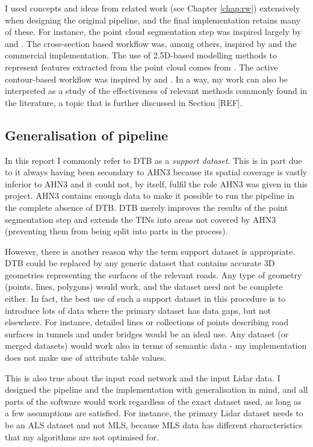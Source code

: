 I used concepts and ideas from related work (see Chapter \ref{chap:rw}) extensively when designing the original pipeline, and the final implementation retains many of these. For instance, the point cloud segmentation step was inspired largely by \cite{oudeElberink_vosselman_2009} and \cite{boyko_funkhauser_2011}. The cross-section based workflow was, among others, inspired by \cite{yang_etal_2013} and the commercial implementation. The use of 2.5D-based modelling methods to represent features extracted from the point cloud comes from \cite{oudeElberink_vosselman_2006}. The active contour-based workflow was inspired by \cite{boyko_funkhauser_2011} and \cite{gopfert_etal_2011}. In a way, my work can also be interpreted as a study of the effectiveness of relevant methods commonly found in the literature, a topic that is further discussed in Section [REF].

\subsection{Generalisation of pipeline}
\label{sub:m_generalisation}

In this report I commonly refer to DTB as a \textit{support dataset}. This is in part due to it always having been secondary to AHN3 because its spatial coverage is vastly inferior to AHN3 and it could not, by itself, fulfil the role AHN3 was given in this project. AHN3 contains enough data to make it possible to run the pipeline in the complete absence of DTB. DTB merely improves the results of the point segmentation step and extends the TINs into areas not covered by AHN3 (preventing them from being split into parts in the process).

However, there is another reason why the term support dataset is appropriate. DTB could be replaced by any generic dataset that contains accurate 3D geometries representing the surfaces of the relevant roads. Any type of geometry (points, lines, polygons) would work, and the dataset need not be complete either. In fact, the best use of such a support dataset in this procedure is to introduce lots of data where the primary dataset has data gaps, but not elsewhere. For instance, detailed lines or collections of points describing road surfaces in tunnels and under bridges would be an ideal use. Any dataset (or merged datasets) would work also in terms of semantic data - my implementation does not make use of attribute table values.

This is also true about the input road network and the input Lidar data. I designed the pipeline and the implementation with generalisation in mind, and all parts of the software would work regardless of the exact dataset used, as long as a few assumptions are satisfied. For instance, the primary Lidar dataset needs to be an ALS dataset and not MLS, because MLS data has different characteristics that my algorithms are not optimised for.

